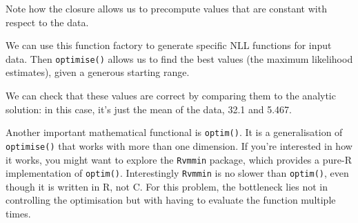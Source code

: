 Note how the closure allows us to precompute values that are constant
with respect to the data.

We can use this function factory to generate specific NLL functions for
input data. Then \texttt{optimise()} allows us to find the best values
(the maximum likelihood estimates), given a generous starting range.

\begin{Shaded}
\begin{Highlighting}[]
\StringTok{ }\NormalTok{(}\NormalTok{, }\NormalTok{, }\NormalTok{, }\NormalTok{, }\NormalTok{, }\NormalTok{, }\NormalTok{, }\NormalTok{, }\NormalTok{, }\NormalTok{)}
\StringTok{ }\NormalTok{(}\NormalTok{, }\NormalTok{, }\NormalTok{, }\NormalTok{, }\NormalTok{, }\NormalTok{, }\NormalTok{, }\NormalTok{, }\NormalTok{, }\NormalTok{, }\NormalTok{, }\NormalTok{, }\NormalTok{, }\NormalTok{, }\NormalTok{)}
\StringTok{ }
\StringTok{ }

\NormalTok{(}\NormalTok{, }
\NormalTok{(}\NormalTok{, }
\end{Highlighting}
\end{Shaded}

We can check that these values are correct by comparing them to the
analytic solution: in this case, it's just the mean of the data, 32.1
and 5.467.

Another important mathematical functional is \texttt{optim()}. It is a
generalisation of \texttt{optimise()} that works with more than one
dimension. If you're interested in how it works, you might want to
explore the \texttt{Rvmmin} package, which provides a pure-R
implementation of \texttt{optim()}. Interestingly \texttt{Rvmmin} is no
slower than \texttt{optim()}, even though it is written in R, not C. For
this problem, the bottleneck lies not in controlling the optimisation
but with having to evaluate the function multiple times.

